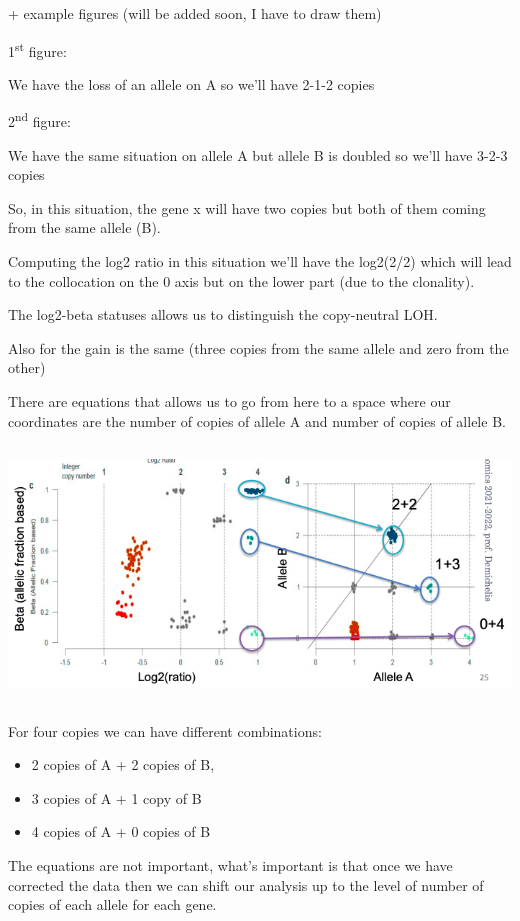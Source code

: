 + example figures (will be added soon, I have to draw them)

1\textsuperscript{st} figure:

We have the loss of an allele on A so we'll have 2-1-2 copies

2\textsuperscript{nd} figure:

We have the same situation on allele A but allele B is doubled so we'll have
3-2-3 copies

So, in this situation, the gene x will have two copies but both of them coming
from the same allele (B).

Computing the log2 ratio in this situation we'll have the log2(2/2) which will
lead to the collocation on the 0 axis but on the lower part (due to the
clonality).

The log2-beta statuses allows us to distinguish the copy-neutral LOH.

Also for the gain is the same (three copies from the same allele and zero from
the other)

There are equations that allows us to go from here to a space where our
coordinates are the number of copies of allele A and number of copies of allele
B.\\
\includegraphics[width=6.68889in,height=2.97633in]{image12.png}\\
For four copies
we can have different combinations:

\begin{itemize}
\item
  2 copies of A + 2 copies of B,
\item
  3 copies of A + 1 copy of B
\item
  4 copies of A + 0 copies of B
\end{itemize}

The equations are not important, what's important is that once we have corrected
the data then we can shift our analysis up to the level of number of copies of
each allele for each gene.


